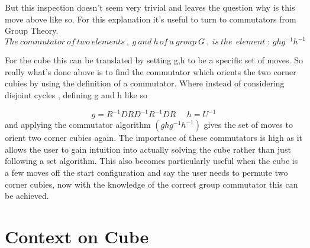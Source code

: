 \documentclass{article}
\begin{document}
But this inspection doesn't seem very trivial and leaves the question why is this move above like so. For this explanation it's useful to turn to commutators from Group Theory. 
\begin{equation}
The\ commutator\ of\ two\ elements\ ,\ g\ and\ h\, of\ a\ group\ G\ ,\ is\ the\ \ element\ :\ ghg^{-1}h^{-1}
\end{equation}

For the cube this can be translated by setting g,h to be a specific set of moves. So really what's done above is to find the commutator which orients the two corner cubies by using the definition of a commutator. Where instead of considering disjoint cycles , defining g and h like so

\begin{equation}\label{orient}
	g = R^{-1}DRD^{-1}R^{-1}DR\ \ \ \ \ \ 
    h = U^{-1}
\end{equation}
and applying the commutator algorithm $(ghg^{-1}h^{-1})$ gives the set of moves to orient two corner cubies again. The importance of these commutators is high as it allows the user to gain intuition into actually solving the cube rather than just following a set algorithm. This also becomes particularly useful when the cube is a few moves off the start configuration and say the user needs to permute two corner cubies, now with the knowledge of the correct group commutator this can be achieved.



\section{Context on Cube}
\end{document}
